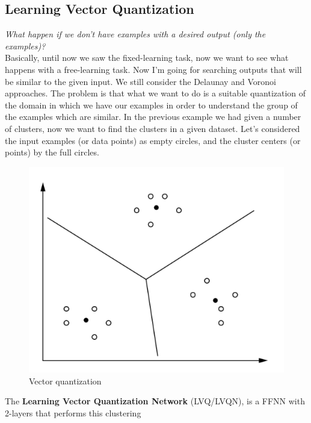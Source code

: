 \documentclass{article}
\begin{document}
\subsection{Learning Vector Quantization}
\textit{What happen if we don't have examples with a desired output (only the examples)?}\\Basically,
until now we saw the fixed-learning task, now we want to see what happens with a free-learning task.
\newline\newline
Now I'm going for searching outputs that will be similar to the given input.
\newline\newline
We still consider the Delaunay and Voronoi approaches.
The problem is that what we want to do is a suitable quantization of the domain in which
we have our examples in order to understand the group of the examples which are similar.
In the previous example we had given a number of clusters, now we want to find the clusters
in a given dataset.
\newline\newline
Let's considered the input examples (or data points) as empty circles, and the cluster centers
(or points) by the full circles.
\begin{figure}[H]
    \centering
    \includegraphics[scale=0.5]{images/vector_quant.png}
    \caption{Vector quantization}
\end{figure}
The \textbf{Learning Vector Quantization Network} (LVQ/LVQN), is a FFNN with 2-layers that performs this clustering
\end{document}
